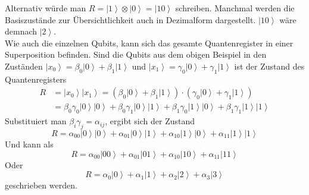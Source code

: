 Alternativ würde man $R=\left|1\right\rangle\otimes\left|0\right\rangle=\left|10\right\rangle$ schreiben. Manchmal werden die Basiszustände zur Übersichtlichkeit auch in Dezimalform dargestellt. $\left|10\right\rangle$ wäre demnach $\left|2\right\rangle$. \\

Wie auch die einzelnen Qubits, kann sich das gesamte Quantenregister in einer Superposition befinden. Sind die Qubits aus dem obigen Beispiel in den Zuständen 
$\left|\left.x_0\right\rangle\right.=\beta_0\left|\left.0\right\rangle\right.+\beta_1\left|\left.1\right\rangle\right.$ und $\left.\left|\left.x_1\right\rangle\right.=\gamma_0\left|\left.0\right\rangle\right.+\gamma_1\left|\left.1\right\rangle\right.\right.$
ist der Zustand des Quantenregisters 
\begin{equation}
\begin{aligned}
    R&=\left|\left.x_0\right\rangle\right.\left|\left.x_1\right\rangle\right.=\left(\beta_0\left|\left.0\right\rangle\right.+\beta_1\left|\left.1\right\rangle\right.\right)\cdot(\gamma_0\left|\left.0\right\rangle\right.+\gamma_1\left|\left.1\right\rangle\right.)\\
    &=\beta_0\gamma_0\left.\left|0\right\rangle\left|0\right\rangle\right.+\beta_0\gamma_1\left|\left.0\right\rangle\left|\left.1\right\rangle\right.\right.+\beta_1\gamma_0\left|\left.1\right\rangle\right.\left|\left.0\right\rangle\right.+\beta_1\gamma_1\left|\left.1\right\rangle\right.\left|\left.1\right\rangle\right.
\end{aligned}
\end{equation}
Substituiert man $\beta_i\gamma_j=\alpha_{ij}$, ergibt sich der Zustand
\begin{equation}
    R=\alpha_{00}\left|\left.0\right\rangle\right.\left|\left.0\right\rangle\right.+\alpha_{01}\left|\left.0\right\rangle\left|\left.1\right\rangle\right.\right.+\alpha_{10}\left|\left.1\right\rangle\right.\left|\left.0\right\rangle\right.+\alpha_{11}\left|\left.1\right\rangle\right.\left|\left.1\right\rangle\right.
\end{equation}
Und kann als
\begin{equation}
    R=\alpha_{00}\left|\left.00\right\rangle\right.+\alpha_{01}\left|\left.01\right\rangle\right.+\alpha_{10}\left|\left.10\right\rangle\right.+\alpha_{11}\left|\left.11\right\rangle\right.
\end{equation}
Oder
\begin{equation}
    R=\alpha_0\left|\left.0\right\rangle\right.+\alpha_1\left|\left.1\right\rangle\right.+\alpha_2\left|\left.2\right\rangle\right.+\alpha_3\left|\left.3\right\rangle\right.
\end{equation}
geschrieben werden.\\

